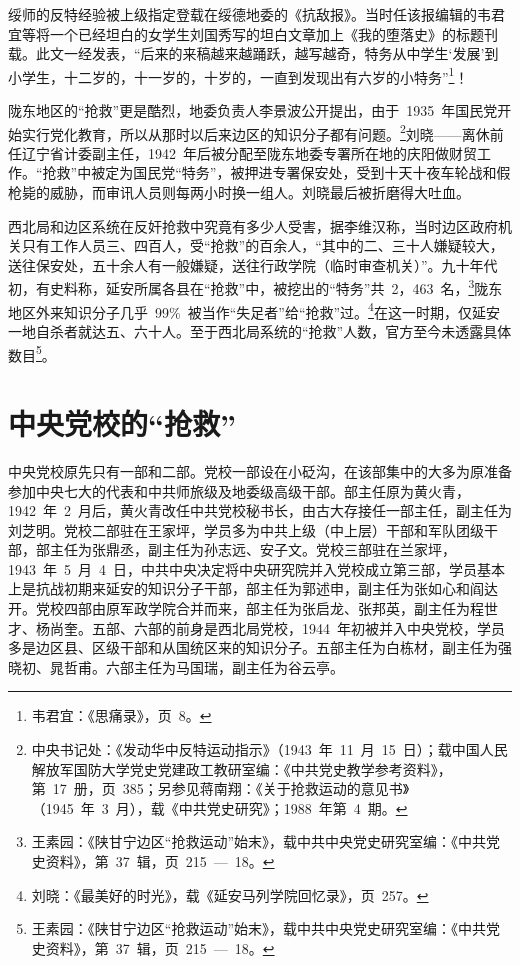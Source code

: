 绥师的反特经验被上级指定登载在绥德地委的《抗敌报》。当时任该报编辑的韦君宜等将一个已经坦白的女学生刘国秀写的坦白文章加上《我的堕落史》的标题刊载。此文一经发表，“后来的来稿越来越踊跃，越写越奇，特务从中学生‘发展’到小学生，十二岁的，十一岁的，十岁的，一直到发现出有六岁的小特务”\footnote{韦君宜：《思痛录》，页~8。}！

陇东地区的“抢救”更是酷烈，地委负责人李景波公开提出，由于~1935~年国民党开始实行党化教育，所以从那时以后来边区的知识分子都有问题。\footnote{中央书记处：《发动华中反特运动指示》（1943~年~11~月~15~日）；载中国人民解放军国防大学党史党建政工教研室编：《中共党史教学参考资料》，第~17~册，页~385；另参见蒋南翔：《关于抢救运动的意见书》（1945~年~3~月），载《中共党史研究》；1988~年第~4~期。}刘晓——离休前任辽宁省计委副主任，1942~年后被分配至陇东地委专署所在地的庆阳做财贸工作。“抢救”中被定为国民党“特务”，被押进专署保安处，受到十天十夜车轮战和假枪毙的威胁，而审讯人员则每两小时换一组人。刘晓最后被折磨得大吐血。

西北局和边区系统在反奸抢救中究竟有多少人受害，据李维汉称，当时边区政府机关只有工作人员三、四百人，受“抢救”的百余人，“其中的二、三十人嫌疑较大，送往保安处，五十余人有一般嫌疑，送往行政学院（临时审查机关）”。九十年代初，有史料称，延安所属各县在“抢救”中，被挖出的“特务”共~2，463~名，\footnote{王素园：《陕甘宁边区“抢救运动”始末》，载中共中央党史研究室编：《中共党史资料》，第~37~辑，页~215~—~18。}陇东地区外来知识分子几乎~99\%~被当作“失足者”给“抢救”过。\footnote{刘晓：《最美好的时光》，载《延安马列学院回忆录》，页~257。}在这一时期，仅延安一地自杀者就达五、六十人。至于西北局系统的“抢救”人数，官方至今未透露具体数目\footnote{王素园：《陕甘宁边区“抢救运动”始末》，载中共中央党史研究室编：《中共党史资料》，第~37~辑，页~215~—~18。}。

\section{中央党校的“抢救”}

中央党校原先只有一部和二部。党校一部设在小砭沟，在该部集中的大多为原准备参加中央七大的代表和中共师旅级及地委级高级干部。部主任原为黄火青，1942~年~2~月后，黄火青改任中共党校秘书长，由古大存接任一部主任，副主任为刘芝明。党校二部驻在王家坪，学员多为中共上级（中上层）干部和军队团级干部，部主任为张鼎丞，副主任为孙志远、安子文。党校三部驻在兰家坪，1943~年~5~月~4~日，中共中央决定将中央研究院并入党校成立第三部，学员基本上是抗战初期来延安的知识分子干部，部主任为郭述申，副主任为张如心和阎达开。党校四部由原军政学院合并而来，部主任为张启龙、张邦英，副主任为程世才、杨尚奎。五部、六部的前身是西北局党校，1944~年初被并入中央党校，学员多是边区县、区级干部和从国统区来的知识分子。五部主任为白栋材，副主任为强晓初、晁哲甫。六部主任为马国瑞，副主任为谷云亭。

